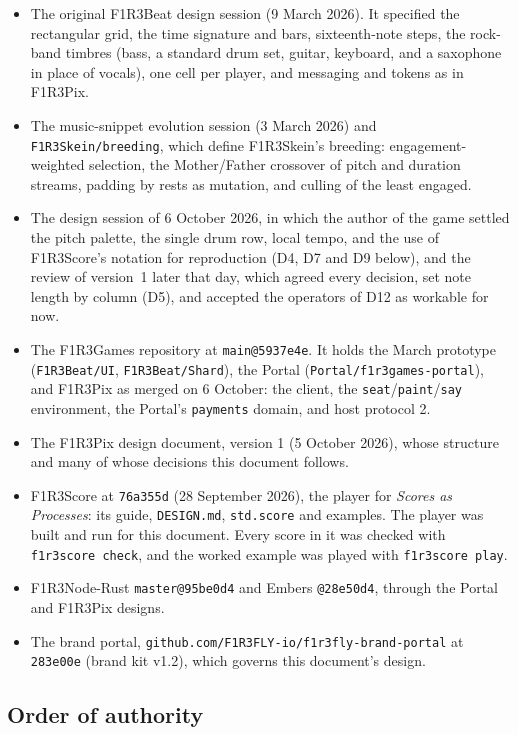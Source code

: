 \documentclass[11pt,a4paper]{article}
\newcommand{\code}[1]{\texttt{#1}}
\begin{document}
\begin{itemize}[leftmargin=1.2em,itemsep=2pt]
\item The original F1R3Beat design session (9 March 2026). It specified the rectangular grid,
  the time signature and bars, sixteenth-note steps, the rock-band timbres (bass, a standard
  drum set, guitar, keyboard, and a saxophone in place of vocals), one cell per player, and
  messaging and tokens as in F1R3Pix.
\item The music-snippet evolution session (3 March 2026) and \code{F1R3Skein/breeding}, which
  define F1R3Skein's breeding: engagement-weighted selection, the Mother/Father crossover of
  pitch and duration streams, padding by rests as mutation, and culling of the least engaged.
\item The design session of 6 October 2026, in which the author of the game settled the pitch
  palette, the single drum row, local tempo, and the use of F1R3Score's notation for
  reproduction (D4, D7 and D9 below), and the review of version~1 later that day, which agreed
  every decision, set note length by column (D5), and accepted the operators of D12 as
  workable for now.
\item The F1R3Games repository at \code{main@5937e4e}. It holds the March prototype
  (\code{F1R3Beat/UI}, \code{F1R3Beat/Shard}), the Portal (\code{Portal/f1r3games-portal}),
  and F1R3Pix as merged on 6 October: the client, the \code{seat}/\code{paint}/\code{say}
  environment, the Portal's \code{payments} domain, and host protocol 2.
\item The F1R3Pix design document, version 1 (5 October 2026), whose structure and many of
  whose decisions this document follows.
\item F1R3Score at \code{76a355d} (28 September 2026), the player for \emph{Scores as
  Processes}: its guide, \code{DESIGN.md}, \code{std.score} and examples. The player was built
  and run for this document. Every score in it was checked with \code{f1r3score check}, and
  the worked example was played with \code{f1r3score play}.
\item F1R3Node-Rust \code{master@95be0d4} and Embers \code{@28e50d4}, through the Portal and
  F1R3Pix designs.
\item The brand portal, \code{github.com/F1R3FLY-io/f1r3fly-brand-portal} at \code{283e00e}
  (brand kit v1.2), which governs this document's design.
\end{itemize}

\subsection{Order of authority}
\end{document}
